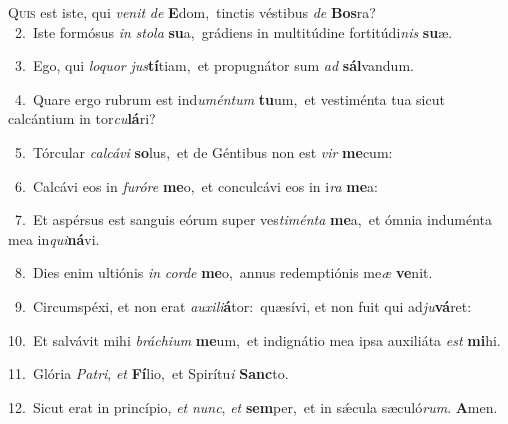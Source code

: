 \lettrine{\initial\textcolor{\initialcolor}{Q}}{uis} est iste, qui \textit{ve}\-\textit{nit} \textit{de} \textbf{E}\-dom,~\star tinctis véstibus \textit{de} \textbf{Bos}\-ra?\\
{\numbfont\textcolor{\numbcolor}{~2.}}~Iste formósus \textit{in} \textit{sto}\-\textit{la} \textbf{su}\-a,~\star grádiens in multitúdine fortitúdi\textit{nis} \textbf{su}\-æ.\par
{\numbfont\textcolor{\numbcolor}{~3.}}~Ego, qui \textit{lo}\-\textit{quor} \textit{jus}\-\textbf{tí}tiam,~\star et propugnátor sum \textit{ad} \textbf{sál}\-vandum.\par
{\numbfont\textcolor{\numbcolor}{~4.}}~Quare ergo rubrum est ind\-\textit{u}\-\textit{mén}\textit{tum} \textbf{tu}\-um,~\star et vestiménta tua sicut calcántium in tor\-\textit{cu}\-\textbf{lá}ri?\par
{\numbfont\textcolor{\numbcolor}{~5.}}~Tórcular \textit{cal}\-\textit{cá}\textit{vi} \textbf{so}\-lus,~\star et de Géntibus non est \textit{vir} \textbf{me}\-cum:\par
{\numbfont\textcolor{\numbcolor}{~6.}}~Calcávi eos in \textit{fu}\-\textit{ró}\textit{re} \textbf{me}\-o,~\star et conculcávi eos in i\textit{ra} \textbf{me}\-a:\par
{\numbfont\textcolor{\numbcolor}{~7.}}~Et aspérsus est sanguis eórum super ves\-\textit{ti}\-\textit{mén}\textit{ta} \textbf{me}\-a,~\star et ómnia induménta mea in\-\textit{qui}\-\textbf{ná}vi.\par
{\numbfont\textcolor{\numbcolor}{~8.}}~Dies enim ultiónis \textit{in} \textit{cor}\-\textit{de} \textbf{me}\-o,~\star annus redemptiónis me\textit{æ} \textbf{ve}\-nit.\par
{\numbfont\textcolor{\numbcolor}{~9.}}~Circumspéxi, et non erat \textit{au}\-\textit{xi}\textit{li}\textbf{á}tor:~\star quæsívi, et non fuit qui ad\-\textit{ju}\-\textbf{vá}ret:\par
{\numbfont\textcolor{\numbcolor}{10.}}~Et salvávit mihi \textit{brá}\-\textit{chi}\textit{um} \textbf{me}\-um,~\star et indignátio mea ipsa auxiliáta \textit{est} \textbf{mi}\-hi.\par
{\numbfont\textcolor{\numbcolor}{11.}}~Glória \textit{Pa}\-\textit{tri}, \textit{et} \textbf{Fí}\-lio,~\star et Spirítu\textit{i} \textbf{Sanc}\-to.\par
{\numbfont\textcolor{\numbcolor}{12.}}~Sicut erat in princípio, \textit{et} \textit{nunc}\-, \textit{et} \textbf{sem}\-per,~\star et in sǽcula sæculó\-\textit{rum}\-. \textbf{A}\-men.\par

